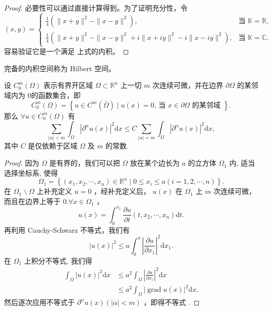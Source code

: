 \documentclass[lang=cn,newtx,10pt,scheme=chinese,thmcnt=chapter]{elegantbook}
\newcommand{\dif}{\mathrm{d}}
\begin{document}
\begin{proof}
必要性可以通过直接计算得到。为了证明充分性，令
\begin{equation*}
(x, y) = \begin{cases}
\frac{1}{4}\left(\|x + y\|^2 - \|x - y\|^2\right), & \text{当 } \mathbb{K} = \mathbb{R}, \\
\frac{1}{4}\left(\|x + y\|^2 - \|x - y\|^2 + i\|x + i y\|^2 - i\|x - i y\|^2\right), & \text{当 } \mathbb{K} = \mathbb{C}.
\end{cases}
\end{equation*}
容易验证它是一个满足 上式的内积。
\end{proof}
\begin{definition}
完备的内积空间称为 Hilbert 空间。
\end{definition}
\begin{lemma}设 $C_0^m(\Omega)$ 表示有界开区域 $\Omega \subset \mathbb{R} ^n$ 上一切 $m$ 次连续可微，并在边界 $\partial \Omega$ 的某邻域内为 0的函数集合，即
\begin{equation*}
C_0^m(\Omega)=\left\{u \in C^m(\bar{\Omega}) \mid u(x)=0 \text {, 当 } x \in \partial \Omega \text { 的某邻域 }\right\} .
\end{equation*}
那么 $\forall u \in C_0^m(\Omega)$ 有
\begin{equation*}
\sum_{|\alpha|<m} \int_{\Omega}\left|\partial^\alpha u(x)\right|^2 \dif x \leqslant C \sum_{|\alpha|=m} \int_{\Omega}\left|\partial^\alpha u(x)\right|^2 \dif x,
\end{equation*}
其中 $C$ 是仅依赖于区域 $\Omega$ 及 $m$ 的常数.
\end{lemma}
\begin{proof}
因为 $\Omega$ 是有界的，我们可以把 $\Omega$ 放在某个边长为 $a$ 的立方体 $\Omega_1$ 内, 适当选择坐标系, 使得
\begin{equation*}
\Omega_1=\left\{\left(x_1, x_2, \cdots, x_n\right) \in \mathbb{R} ^n \mid 0 \leqslant x_i \leqslant a(i=1,2, \cdots, n)\right\} .
\end{equation*}
在 $\Omega_1 \backslash \Omega$ 上补充定义 $u=0$ ，经补充定义后， $u(x)$ 在 $\Omega_1$ 上 $m$ 次连续可微，而且在边界上等于 $0 . \forall x \in \Omega_1$ ，
\begin{equation*}
u(x)=\int_0^{x_1} \frac{\partial u}{\partial t}\left(t, x_2, \cdots, x_n\right) \dif t .
\end{equation*}
再利用 Cauchy-Schwarz 不等式，我们有
\begin{equation*}
|u(x)|^2 \leqslant a \int_0^a\left|\frac{\partial u}{\partial x_1}\right|^2 \dif x_1 .
\end{equation*}
在 $\Omega_1$ 上积分不等式, 我们得\begin{equation*}
\begin{aligned}
\int_{\Omega}|u(x)|^2 \dif x & \leqslant a^2 \int_{\Omega}\left|\frac{\partial u}{\partial x_1}\right|^2 \dif x \\
& \leqslant a^2 \int_{\Omega}|\operatorname{grad} u(x)|^2 \dif x .
\end{aligned}
\end{equation*}
然后逐次应用不等式于 $\partial^\alpha u(x)(|\alpha|<m)$ ，即得不等式 .
\end{proof}
\end{document}
